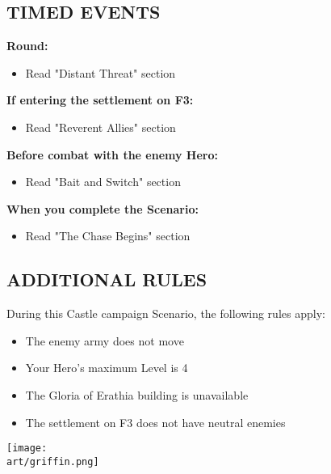 \newpage

\begin{multicols}{2}

\subsection*{\MakeUppercase{Timed Events}}

\textbf{ Round:}
\begin{itemize}
  \item Read "Distant Threat" section
\end{itemize}

\textbf{If entering the settlement on F3:}
\begin{itemize}
  \item Read "Reverent Allies" section
\end{itemize}

\textbf{Before combat with the enemy Hero:}
\begin{itemize}
  \item Read "Bait and Switch" section
\end{itemize}

\textbf{When you complete the Scenario:}
\begin{itemize}
  \item Read "The Chase Begins" section
\end{itemize}

\subsection*{\MakeUppercase{Additional rules}}

During this Castle campaign Scenario, the following rules apply:

\begin{itemize}
  \item The enemy army does not move
  \item Your Hero's maximum Level is 4
  \item The Gloria of Erathia building is unavailable
  \item The settlement on F3 does not have neutral enemies
\end{itemize}

\columnbreak

\texttt{[image: \\art/griffin.png]}

\end{multicols}


